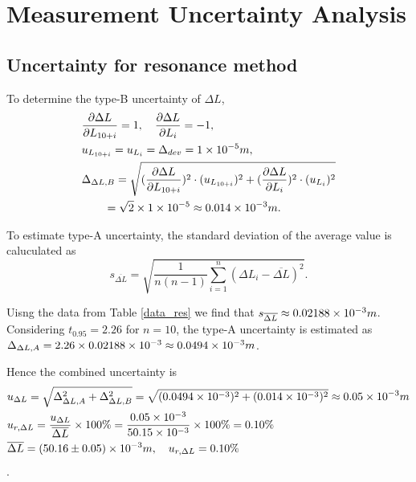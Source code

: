 \section{Measurement Uncertainty Analysis}

\subsection{Uncertainty for resonance method}
    To determine the type-B uncertainty of $\Delta L$,
    \[
    \begin{split}
        &\frac{\partial \Delta L}{\partial L_{10+i}}=1,\quad \frac{\partial \Delta L}{\partial L_i}=-1,\\
        &u_{L_{10+i}}=u_{L_i}=\Delta_{dev}=1\times 10^{-5}m,\\
        &\Delta_{\Delta L,B}=\sqrt{(\frac{\partial \Delta L}{\partial L_{10+i}})^2\cdot (u_{L_{10+i}})^2+(\frac{\partial \Delta L}{\partial L_i})^2\cdot (u_{L_i})^2}\\
        &\quad\quad =\sqrt{2}\times 1\times 10^{-5}\approx0.014\times 10^{-3}m.\\
    \end{split}
    \]

    To estimate type-A uncertainty, the standard deviation of the average value is caluculated as
    \[
        s_{\overline{\Delta L}}=\sqrt{\frac{1}{n(n-1)}\sum_{i=1}^n(\Delta L_i-\overline{\Delta L})^2}.
    \]

    Uisng the data from Table \ref{data_res} we find that $s_{\overline{\Delta L}}\approx 0.02188\times 10^{-3}m$. Considering $t_{0.95}=2.26$ for $n=10$, the type-A uncertainty is estimated as $\Delta_{\Delta L,A}=2.26\times0.02188\times 10^{-3}\approx 0.0494\times 10^{-3}m$.

    Hence the combined uncertainty is 
    \[
    \begin{split}
        &u_{\Delta L}=\sqrt{\Delta_{\Delta L,A}^2+\Delta_{\Delta L,B}^2}=\sqrt{(0.0494\times 10^{-3})^2+(0.014\times 10^{-3})^2}\approx0.05\times 10^{-3}m\\
        &u_{r,\Delta L}=\frac{u_{\Delta L}}{\overline{\Delta L}}\times 100\%=\frac{0.05\times 10^{-3}}{50.15\times 10^{-3}}\times100\%=0.10\%\\
        &\overline{\Delta L}=(50.16\pm 0.05)\times 10^{-3}m,\quad u_{r,\Delta L}=0.10\%
    \end{split}
    \].

